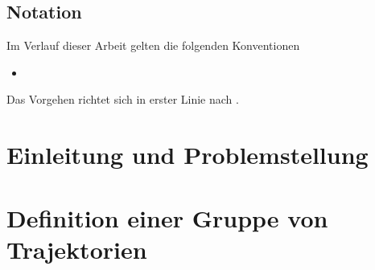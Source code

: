 




\tableofcontents

\section*{Notation}
Im Verlauf dieser Arbeit gelten die folgenden Konventionen
\begin{itemize}
	\item 
\end{itemize}
Das Vorgehen richtet sich in erster Linie nach \textcite{buchin2015}.
\cleardoubleoddemptypage

\chapter{Einleitung und Problemstellung} %
\label{cha:einleitung}


\chapter{Definition einer Gruppe von Trajektorien} %
\label{cha:def_gruppe}


\setcounter{page}{1}
\setcounter{footnote}{0}



\cleardoubleoddemptypage
{}
\setcounter{page}{1}
\appendix
\printbibliography
\printindex
\todototoc
{}
